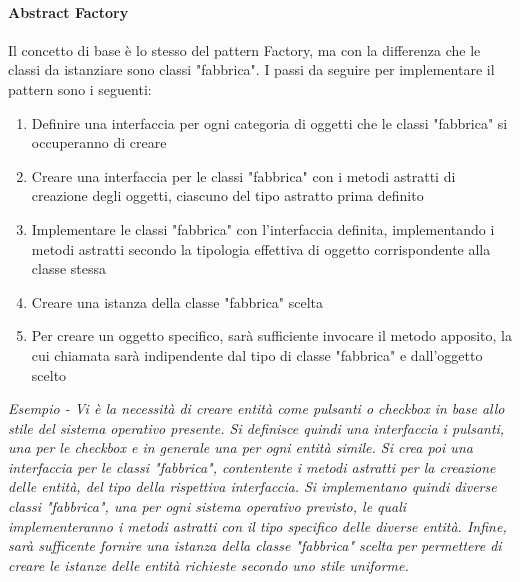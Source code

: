 \documentclass{article}
\begin{document}
            \paragraph{Abstract Factory} Il concetto di base è lo stesso del pattern Factory, ma con la differenza che le classi da istanziare sono classi "fabbrica".
                I passi da seguire per implementare il pattern sono i seguenti:
                \begin{enumerate}
                    \item Definire una interfaccia per ogni categoria di oggetti che le classi "fabbrica" si occuperanno di creare
                    \item Creare una interfaccia per le classi "fabbrica" con i metodi astratti di creazione degli oggetti, ciascuno del tipo astratto prima definito
                    \item Implementare le classi "fabbrica" con l'interfaccia definita, implementando i metodi astratti secondo la tipologia effettiva di oggetto corrispondente alla classe stessa
                    \item Creare una istanza della classe "fabbrica" scelta
                    \item Per creare un oggetto specifico, sarà sufficiente invocare il metodo apposito, la cui chiamata sarà indipendente dal tipo di classe "fabbrica" e dall'oggetto scelto
                \end{enumerate}
                \textit{Esempio - Vi è la necessità di creare entità come pulsanti o checkbox in base allo stile del sistema operativo presente.
                    Si definisce quindi una interfaccia i pulsanti, una per le checkbox e in generale una per ogni entità simile.
                    Si crea poi una interfaccia per le classi "fabbrica", contentente i metodi astratti per la creazione delle entità, del tipo della rispettiva interfaccia.
                    Si implementano quindi diverse classi "fabbrica", una per ogni sistema operativo previsto, le quali implementeranno i metodi astratti con il tipo specifico delle diverse entità.
                    Infine, sarà sufficente fornire una istanza della classe "fabbrica" scelta per permettere di creare le istanze delle entità richieste secondo uno stile uniforme.
                }
\end{document}
